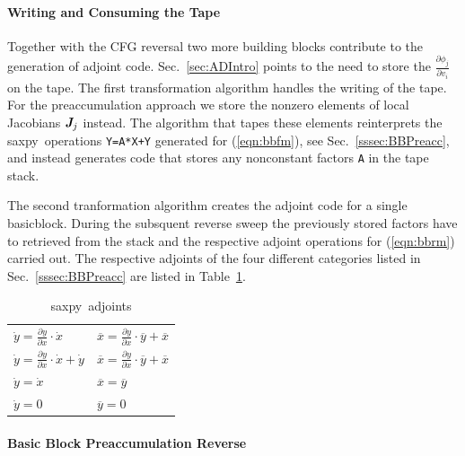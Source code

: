 \documentclass[11pt]{article}
\newcommand{\basicblock}{basicblock}
\newcommand{\saxpy}{saxpy}
\newcommand{\bmJ}{\mbox{\bf\em J}}
\newcommand{\code}[1]{{\small\tt{#1}}}
\newcommand{\refsec}[1]{{Sec.~\ref{#1}}}
\newcommand{\reftab}[1]{{Table~\ref{#1}}}
\newcommand{\refeqn}[1]{{(\ref{#1})}}
\begin{document}
\paragraph{Writing and Consuming the Tape}\label{sssec:bbTA}

Together with the CFG reversal two more building blocks contribute to the 
generation of adjoint code. 
\refsec{sec:ADIntro} points to the need to store the $\frac{\partial \phi_j}{\partial v_i}$ on the tape. 
The first transformation algorithm handles the writing of the tape.
For the preaccumulation approach we store the nonzero elements of local
Jacobians $\bmJ_j$ instead. The algorithm that tapes these elements reinterprets
the \saxpy\ operations \code{Y=A*X+Y} generated for \refeqn{eqn:bbfm}, see \refsec{sssec:BBPreacc}, 
and instead generates code that stores any nonconstant factors \code{A} in the tape stack. 

The second tranformation algorithm creates the adjoint code for a single \basicblock.
During the subsquent reverse sweep the previously stored factors have to retrieved from the stack and 
the respective adjoint operations for \refeqn{eqn:bbrm} carried out. 
The respective adjoints of the four different categories listed in \refsec{sssec:BBPreacc} are listed in 
\reftab{tab:saxpyAdj}.
\begin{table}
  \begin{tabular}{|l|l|}\hline
    $\dot{y} = \frac{\partial y }{\partial x }\cdot \dot{x}$ &  $\overline{x} = \frac{\partial y }{\partial x }\cdot \overline{y} + \overline{x}$ \\
    $\dot{y} = \frac{\partial y }{\partial x }\cdot \dot{x} + \dot{y}$ & $\overline{x} = \frac{\partial y }{\partial x }\cdot \overline{y} + \overline{x}$ \\
    $\dot{y} = \dot{x}$ 					& $\overline{x} = \overline{y}$ \\
    $\dot{y} = 0$ 						& $\overline{y} = 0$ 
  \end{tabular}
  \caption{\saxpy\ adjoints} \label{tab:saxpyAdj}
\end{table} 



\paragraph{Basic Block Preaccumulation Reverse}\label{sssec:BBRev}
\end{document}
